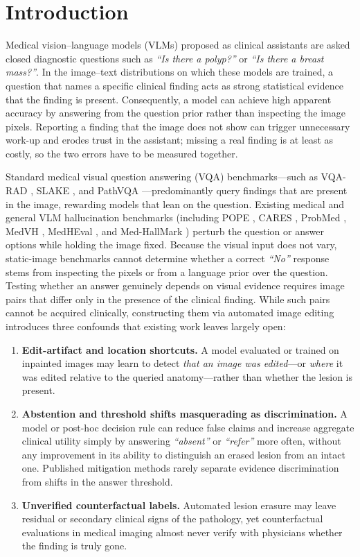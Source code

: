 \documentclass[5p,times,twocolumn,authoryear]{elsarticle}
\begin{document}
\section{Introduction}
\label{sec:intro}
Medical vision--language models (VLMs) proposed as clinical assistants are asked closed diagnostic questions such as \emph{``Is there a polyp?''} or \emph{``Is there a breast mass?''}. In the image--text distributions on which these models are trained, a question that names a specific clinical finding acts as strong statistical evidence that the finding is present. Consequently, a model can achieve high apparent accuracy by answering from the question prior rather than inspecting the image pixels. Reporting a finding that the image does not show can trigger unnecessary work-up and erodes trust in the assistant; missing a real finding is at least as costly, so the two errors have to be measured together.

Standard medical visual question answering (VQA) benchmarks---such as VQA-RAD \citep{lau2018vqarad}, SLAKE \citep{liu2021slake}, and PathVQA \citep{he2020pathvqa}---predominantly query findings that are present in the image, rewarding models that lean on the question. Existing medical and general VLM hallucination benchmarks (including POPE \citep{li2023pope}, CARES \citep{xia2024cares}, ProbMed \citep{yan2024probmed}, MedVH \citep{gu2024medvh}, MedHEval \citep{chang2024medheval}, and Med-HallMark \citep{chen2024medhallmark}) perturb the question or answer options while holding the image fixed. Because the visual input does not vary, static-image benchmarks cannot determine whether a correct \emph{``No''} response stems from inspecting the pixels or from a language prior over the question. Testing whether an answer genuinely depends on visual evidence requires image pairs that differ only in the presence of the clinical finding. While such pairs cannot be acquired clinically, constructing them via automated image editing introduces three confounds that existing work leaves largely open:
\begin{enumerate}[leftmargin=*,nosep]
    \item \textbf{Edit-artifact and location shortcuts.} A model evaluated or trained on inpainted images may learn to detect \emph{that an image was edited}---or \emph{where} it was edited relative to the queried anatomy---rather than whether the lesion is present.
    \item \textbf{Abstention and threshold shifts masquerading as discrimination.} A model or post-hoc decision rule can reduce false claims and increase aggregate clinical utility simply by answering \emph{``absent''} or \emph{``refer''} more often, without any improvement in its ability to distinguish an erased lesion from an intact one. Published mitigation methods rarely separate evidence discrimination from shifts in the answer threshold.
    \item \textbf{Unverified counterfactual labels.} Automated lesion erasure may leave residual or secondary clinical signs of the pathology, yet counterfactual evaluations in medical imaging almost never verify with physicians whether the finding is truly gone.
\end{enumerate}
\end{document}
